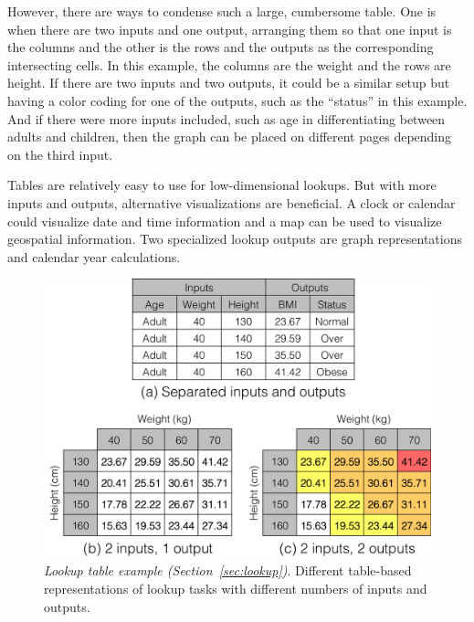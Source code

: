 \documentclass{sig-alternate}
\begin{document}
However, there are ways to condense such a large, cumbersome table.
One is when there are two inputs and one output, arranging them so that one input is the columns and the other is the rows and the outputs as the corresponding intersecting cells. In this example, the columns are the weight and the rows are height. If there are two inputs and two outputs, it could be a similar setup but having a color coding for one of the outputs, such as the ``status'' in this example. And if there were more inputs included, such as age in differentiating between adults and children, then the graph can be placed on different pages depending on the third input.

Tables are relatively easy to use for low-dimensional lookups. But with more inputs and outputs, alternative visualizations are beneficial. A clock or calendar could visualize date and time information and a map can be used to visualize geospatial information. Two specialized lookup outputs are graph representations and calendar year calculations.


\begin{figure}
\centering
\includegraphics[width=\linewidth]{img/table.png}
\caption{\emph{Lookup table example (Section~\ref{sec:lookup})}. Different table-based representations of lookup tasks with different numbers of inputs and outputs.}
\label{fig:table}
\end{figure}
\end{document}
